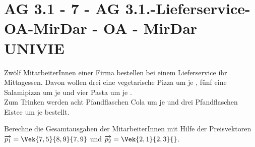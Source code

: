\section{AG 3.1 - 7 - AG 3.1.-Lieferservice-OA-MirDar - OA - MirDar UNIVIE}

\begin{beispiel}[AG 3.1]{1}
Zwölf MitarbeiterInnen einer Firma bestellen bei einem Lieferservice ihr Mittagessen. Davon wollen drei eine vegetarische Pizza um je , fünf eine Salamipizza um je  und vier Pasta um je . \\
Zum Trinken werden acht Pfandflaschen Cola um je  und drei Pfandflaschen Eistee um je  bestellt.


Berechne die Gesamtausgaben der MitarbeiterInnen mit Hilfe der Preisvektoren\\ 
$\overrightarrow{p_1} = \Vek{7,5}{8,9}{7,9}$ und $\overrightarrow{p_2} = \Vek{2,1}{2,3}{}$. \\

\end{beispiel}